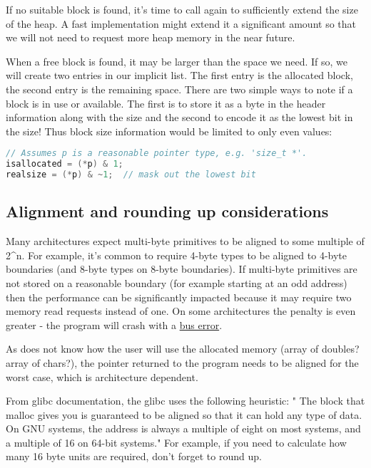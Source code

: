 If no suitable block is found, it's time to call  again to sufficiently extend the size of the heap. A fast implementation might extend it a significant amount so that we will not need to request more heap memory in the near future.

When a free block is found, it may be larger than the space we need. If so, we will create two entries in our implicit list. The first entry is the allocated block, the second entry is the remaining space. There are two simple ways to note if a block is in use or available. The first is to store it as a byte in the header information along with the size and the second to encode it as the lowest bit in the size! Thus block size information would be limited to only even values:

\begin{lstlisting}[language=C]
// Assumes p is a reasonable pointer type, e.g. 'size_t *'.
isallocated = (*p) & 1;
realsize = (*p) & ~1;  // mask out the lowest bit
\end{lstlisting}

\subsection{Alignment and rounding up considerations}

Many architectures expect multi-byte primitives to be aligned to some multiple of 2\^{}n. For example, it's common to require 4-byte types to be aligned to 4-byte boundaries (and 8-byte types on 8-byte boundaries). If multi-byte primitives are not stored on a reasonable boundary (for example starting at an odd address) then the performance can be significantly impacted because it may require two memory read requests instead of one. On some architectures the penalty is even greater - the program will crash with a \href{http://en.wikipedia.org/wiki/Bus_error\#Unaligned_access}{bus error}.

As  does not know how the user will use the allocated memory (array of doubles? array of chars?), the pointer returned to the program needs to be aligned for the worst case, which is architecture dependent.

From glibc documentation, the glibc  uses the following heuristic: " The block that malloc gives you is guaranteed to be aligned so that it can hold any type of data. On GNU systems, the address is always a multiple of eight on most systems, and a multiple of 16 on 64-bit systems." For example, if you need to calculate how many 16 byte units are required, don't forget to round up.

